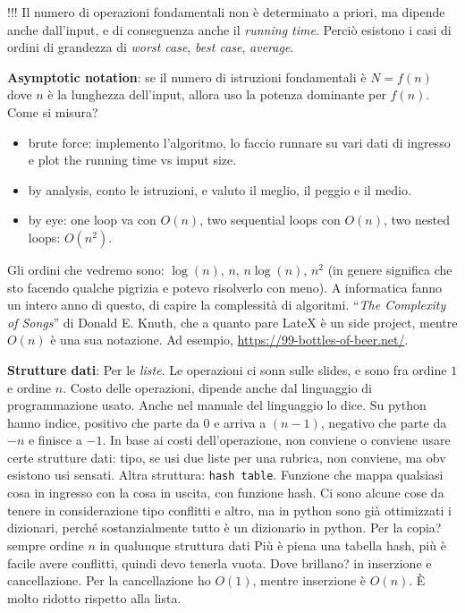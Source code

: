 \documentclass[10pt, a4paper, titlepage]{book}
\begin{document}
!!! Il numero di operazioni fondamentali non è determinato a priori, ma dipende anche dall'input, e di conseguenza anche il \textit{running time}. Perciò esistono i casi di ordini di grandezza di \textit{worst case}, \textit{best case}, \textit{average}.

\textbf{Asymptotic notation}: se il numero di istruzioni fondamentali è $N=f(n)$ dove $n$ è la lunghezza dell'input, allora uso la potenza dominante per $f(n)$.
Come si misura?
\begin{itemize}
	\item brute force: implemento l'algoritmo, lo faccio runnare su vari dati di ingresso e plot the running time vs imput size.
	\item by analysis, conto le istruzioni, e valuto il meglio, il peggio e il medio.
	\item by eye: one loop va con $O(n)$, two sequential loops con $O(n)$, two nested loops: $O(n^2)$.
\end{itemize} 


Gli ordini che vedremo sono: $\log(n)$, $n$, $n\log(n)$, $n^2$ (in genere significa che sto facendo qualche pigrizia e potevo risolverlo con meno).
A informatica fanno un intero anno di questo, di capire la complessità di algoritmi.
``\textit{The Complexity of Songs}'' di Donald E. Knuth, che a quanto pare LateX è un side project, mentre $O(n)$ è una sua notazione. Ad esempio, \url{https://99-bottles-of-beer.net/}.

\textbf{Strutture dati}: Per le \textit{liste}. Le operazioni ci sonn sulle slides, e sono fra ordine $1$ e ordine $n$. Costo delle operazioni, dipende anche dal linguaggio di programmazione usato. Anche nel manuale del linguaggio lo dice.
Su python hanno indice, positivo che parte da $0$ e arriva a $(n-1)$, negativo che parte da $-n$ e finisce a $-1$. 
In base ai costi dell'operazione, non conviene o conviene usare certe strutture dati: tipo, se usi due liste per una rubrica, non conviene, ma obv esistono usi sensati.
Altra struttura: \texttt{hash table}. Funzione che mappa qualsiasi cosa in ingresso con la cosa in uscita, con funzione hash. Ci sono alcune cose da tenere in considerazione tipo conflitti e altro, ma in python sono già ottimizzati i dizionari, perché sostanzialmente tutto è un dizionario in python.
Per la copia? sempre ordine $n$ in qualunque struttura dati
Più è piena una tabella hash, più è facile avere conflitti, quindi devo tenerla vuota. Dove brillano? in inserzione e cancellazione. Per la cancellazione ho $O(1)$, mentre inserzione è $O(n)$. È molto ridotto rispetto alla lista.
\end{document}

